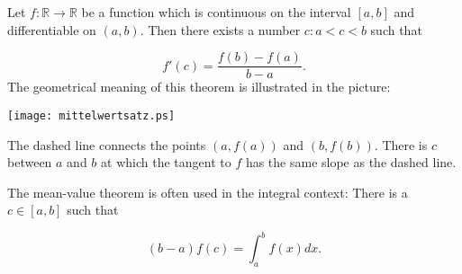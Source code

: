 \documentclass[12pt]{article}
\newcommand{\reals}{\mathbb{R}}
\begin{document}
Let $f:\reals \to \reals$ be a function which is continuous on the interval $[a,b]$ and differentiable on $(a,b)$.  Then there exists a number $c: a < c < b$ such that

\begin{equation}
f'(c) = \frac{f(b) - f(a)}{b - a}.
\end{equation}
The geometrical meaning of this theorem is illustrated in the picture:\\[10pt]
\begin{center}
\texttt{[image: mittelwertsatz.ps]}
\end{center}
The dashed line connects the points $(a,f(a))$ and $(b,f(b))$. There is $c$ between $a$ and $b$ at which the tangent to $f$ has the same slope as the dashed line.

The mean-value theorem is often used in the integral context: There is a $c \in [a,b]$ such that

\begin{equation}
(b-a)f(c) = \int_{a}^{b} f(x) dx.
\end{equation}
\end{document}
